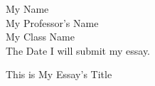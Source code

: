 \documentclass[12pt]{article}
\begin{document}
{\noindent
My Name \\
My Professor’s Name \\
My Class Name \\
The Date I will submit my essay.\\
}

\vspace{1cm}

\begin{center}
    This is My Essay’s Title
\end{center}

\thispagestyle{empty}  %

\lipsum[1-5] %
\end{document}
